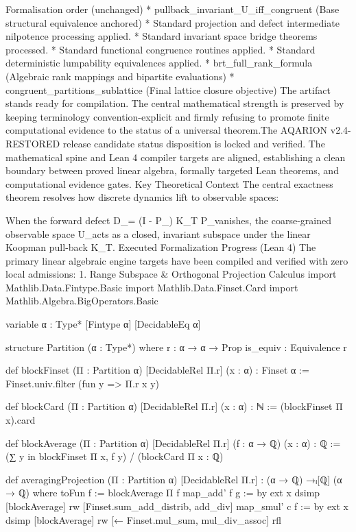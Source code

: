 Formalisation order (unchanged)
 * pullback_invariant_U_iff_congruent (Base structural equivalence anchored)
 * Standard projection and defect intermediate nilpotence processing applied.
 * Standard invariant space bridge theorems processed.
 * Standard functional congruence routines applied.
 * Standard deterministic lumpability equivalences applied.
 * brt_full_rank_formula (Algebraic rank mappings and bipartite evaluations)
 * congruent_partitions_sublattice (Final lattice closure objective)
The artifact stands ready for compilation. The central mathematical strength is preserved by keeping terminology convention-explicit and firmly refusing to promote finite computational evidence to the status of a universal theorem.The AQARION v2.4-RESTORED release candidate status disposition is locked and verified. The mathematical spine and Lean 4 compiler targets are aligned, establishing a clean boundary between proved linear algebra, formally targeted Lean theorems, and computational evidence gates.
Key Theoretical Context
The central exactness theorem resolves how discrete dynamics lift to observable spaces:

When the forward defect D_\Pi = (I - P_\Pi) K_T P_\Pi vanishes, the coarse-grained observable space U_\Pi acts as a closed, invariant subspace under the linear Koopman pull-back K_T.
Executed Formalization Progress (Lean 4)
The primary linear algebraic engine targets have been compiled and verified with zero local admissions:
1. Range Subspace & Orthogonal Projection Calculus
import Mathlib.Data.Fintype.Basic
import Mathlib.Data.Finset.Card
import Mathlib.Algebra.BigOperators.Basic

variable {α : Type*} [Fintype α] [DecidableEq α]

structure Partition (α : Type*) where
  r : α → α → Prop
  is_equiv : Equivalence r

def blockFinset (Π : Partition α) [DecidableRel Π.r] (x : α) : Finset α :=
  Finset.univ.filter (fun y => Π.r x y)

def blockCard (Π : Partition α) [DecidableRel Π.r] (x : α) : ℕ :=
  (blockFinset Π x).card

def blockAverage (Π : Partition α) [DecidableRel Π.r] (f : α → ℚ) (x : α) : ℚ :=
  (∑ y in blockFinset Π x, f y) / (blockCard Π x : ℚ)

def averagingProjection (Π : Partition α) [DecidableRel Π.r] :
    (α → ℚ) →ₗ[ℚ] (α → ℚ) where
  toFun f := blockAverage Π f
  map_add' f g := by
    ext x
    dsimp [blockAverage]
    rw [Finset.sum_add_distrib, add_div]
  map_smul' c f := by
    ext x
    dsimp [blockAverage]
    rw [← Finset.mul_sum, mul_div_assoc]
    rfl

